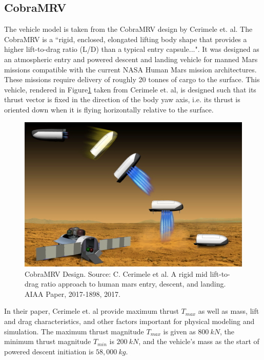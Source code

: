 \subsection{CobraMRV} \label{sec:CobraMRV}
The vehicle model is taken from the CobraMRV design by Cerimele et. al\:\cite{CERIMELE}. The CobraMRV is a ``rigid, enclosed, elongated lifting body shape that provides a higher lift-to-drag ratio (L/D) than a typical entry capsule...". It was designed as an atmospheric entry and powered descent and landing vehicle for manned Mars missions compatible with the current NASA Human Mars mission architectures. These missions require delivery of roughly 20 tonnes of cargo to the surface. This vehicle, rendered in Figure\:\ref{fig:CobraMRV} taken from Cerimele et. al, is designed such that its thrust vector is fixed in the direction of the body yaw axis, i.e. its thrust is oriented down when it is flying horizontally relative to the surface. 

\begin{figure}[H]
	\centering
	\begin{minipage}{4.3 in}
		\includegraphics[width=\linewidth]{Figures/CobraMRV.png}
		\caption{CobraMRV Design. Source: C. Cerimele et al. A rigid mid lift-to-drag ratio approach to human mars entry, descent,
			and landing. AIAA Paper, 2017-1898, 2017. \label{fig:CobraMRV} }
	\end{minipage}
\end{figure}

In their paper, Cerimele et. al\:\cite{CERIMELE} provide maximum thrust $T_{max}$ as well as mass, lift and drag characteristics, and other factors important for physical modeling and simulation. The maximum thrust magnitude $T_{max}$ is given as $800\:kN$, the minimum thrust magnitude $T_{min}$ is $200\:kN$, and the vehicle's mass as the start of powered descent initiation is $58,000\:kg$.

